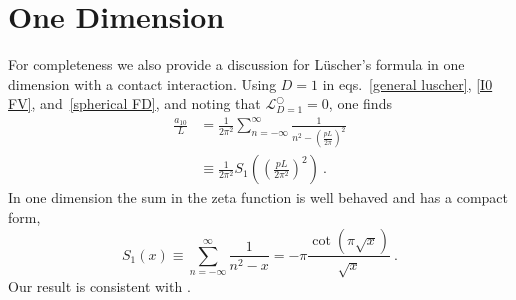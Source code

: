 \section{One Dimension}\label{sec:1D}
For completeness we also provide a discussion for L\"uscher's formula in one dimension with a contact interaction.  Using $D=1$ in eqs.~\eqref{general luscher}, \eqref{I0 FV}, and~\eqref{spherical FD}, and noting that $\mathcal{L}_{D=1}^\bigcirc=0$, one finds 
\begin{align} 
\frac{a_{10}}{L} &=\frac{1}{2 \pi^{2}} \sum_{n=-\infty}^{\infty} \frac{1}{n^{2}-\left(\frac{p L}{2 \pi}\right)^{2}} \\ 
& \equiv \frac{1}{2 \pi^{2}} S_{1}\left(\left(\frac{p L}{2 \pi^{2}}\right)^{2}\right)\ .
\end{align}
In one dimension the sum in the zeta function is well behaved and has a compact form,
\begin{equation}
S_{1}(x) \equiv \sum_{n=-\infty}^{\infty} \frac{1}{n^{2}-x}=-\pi \frac{\cot (\pi \sqrt{x})}{\sqrt{x}}\ .
\end{equation}
Our result is consistent with \cite{}.
